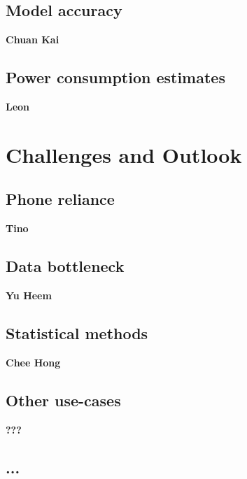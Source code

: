 \documentclass{article}
\begin{document}
\subsection{Model accuracy}

\textbf{Chuan Kai}

\subsection{Power consumption estimates}

\textbf{Leon}

\section{Challenges and Outlook}

\subsection{Phone reliance}

\textbf{Tino}

\subsection{Data bottleneck}

\textbf{Yu Heem}

\subsection{Statistical methods}

\textbf{Chee Hong}

\subsection{Other use-cases}

\textbf{???}

\subsection{...}
\end{document}
